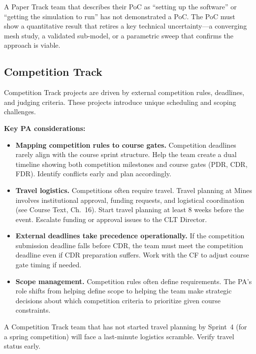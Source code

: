 \begin{redflag}
A Paper Track team that describes their PoC as ``setting up the software'' or ``getting the simulation to run'' has not demonstrated a PoC. The PoC must show a quantitative result that retires a key technical uncertainty---a converging mesh study, a validated sub-model, or a parametric sweep that confirms the approach is viable.
\end{redflag}

\subsection{Competition Track}

Competition Track projects are driven by external competition rules, deadlines, and judging criteria. These projects introduce unique scheduling and scoping challenges.

\textbf{Key PA considerations:}

\begin{itemize}[nosep,leftmargin=1.5em]
\item \textbf{Mapping competition rules to course gates.} Competition deadlines rarely align with the course sprint structure. Help the team create a dual timeline showing both competition milestones and course gates (PDR, CDR, FDR). Identify conflicts early and plan accordingly.

\item \textbf{Travel logistics.} Competitions often require travel. Travel planning at Mines involves institutional approval, funding requests, and logistical coordination (see Course Text, Ch.~16). Start travel planning at least 8 weeks before the event. Escalate funding or approval issues to the CLT Director.

\item \textbf{External deadlines take precedence operationally.} If the competition submission deadline falls before CDR, the team must meet the competition deadline even if CDR preparation suffers. Work with the CF to adjust course gate timing if needed.

\item \textbf{Scope management.} Competition rules often define requirements. The PA's role shifts from helping define scope to helping the team make strategic decisions about which competition criteria to prioritize given course constraints.
\end{itemize}

\begin{redflag}
A Competition Track team that has not started travel planning by Sprint~4 (for a spring competition) will face a last-minute logistics scramble. Verify travel status early.
\end{redflag}

